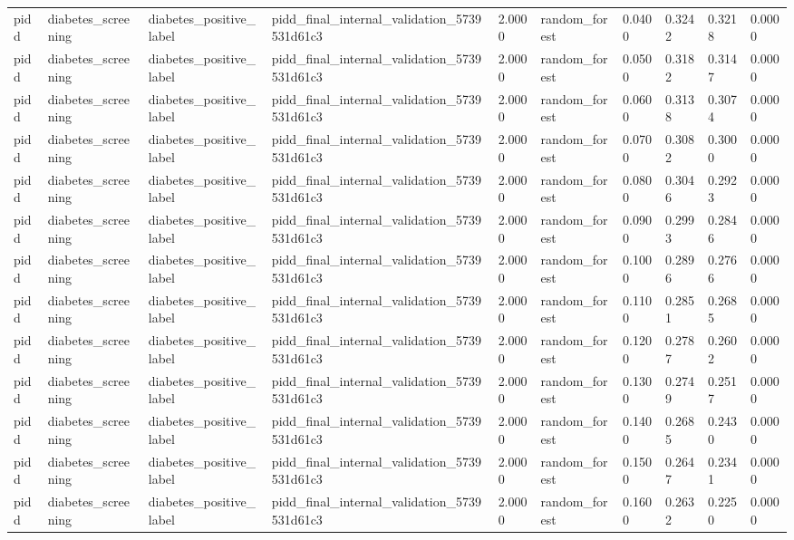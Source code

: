 \begin{tabular}{llllllllll}
pidd & diabetes\_screening & diabetes\_positive\_label & pidd\_final\_internal\_validation\_5739531d61c3 & 2.0000 & random\_forest & 0.0400 & 0.3242 & 0.3218 & 0.0000 \\
pidd & diabetes\_screening & diabetes\_positive\_label & pidd\_final\_internal\_validation\_5739531d61c3 & 2.0000 & random\_forest & 0.0500 & 0.3182 & 0.3147 & 0.0000 \\
pidd & diabetes\_screening & diabetes\_positive\_label & pidd\_final\_internal\_validation\_5739531d61c3 & 2.0000 & random\_forest & 0.0600 & 0.3138 & 0.3074 & 0.0000 \\
pidd & diabetes\_screening & diabetes\_positive\_label & pidd\_final\_internal\_validation\_5739531d61c3 & 2.0000 & random\_forest & 0.0700 & 0.3082 & 0.3000 & 0.0000 \\
pidd & diabetes\_screening & diabetes\_positive\_label & pidd\_final\_internal\_validation\_5739531d61c3 & 2.0000 & random\_forest & 0.0800 & 0.3046 & 0.2923 & 0.0000 \\
pidd & diabetes\_screening & diabetes\_positive\_label & pidd\_final\_internal\_validation\_5739531d61c3 & 2.0000 & random\_forest & 0.0900 & 0.2993 & 0.2846 & 0.0000 \\
pidd & diabetes\_screening & diabetes\_positive\_label & pidd\_final\_internal\_validation\_5739531d61c3 & 2.0000 & random\_forest & 0.1000 & 0.2896 & 0.2766 & 0.0000 \\
pidd & diabetes\_screening & diabetes\_positive\_label & pidd\_final\_internal\_validation\_5739531d61c3 & 2.0000 & random\_forest & 0.1100 & 0.2851 & 0.2685 & 0.0000 \\
pidd & diabetes\_screening & diabetes\_positive\_label & pidd\_final\_internal\_validation\_5739531d61c3 & 2.0000 & random\_forest & 0.1200 & 0.2787 & 0.2602 & 0.0000 \\
pidd & diabetes\_screening & diabetes\_positive\_label & pidd\_final\_internal\_validation\_5739531d61c3 & 2.0000 & random\_forest & 0.1300 & 0.2749 & 0.2517 & 0.0000 \\
pidd & diabetes\_screening & diabetes\_positive\_label & pidd\_final\_internal\_validation\_5739531d61c3 & 2.0000 & random\_forest & 0.1400 & 0.2685 & 0.2430 & 0.0000 \\
pidd & diabetes\_screening & diabetes\_positive\_label & pidd\_final\_internal\_validation\_5739531d61c3 & 2.0000 & random\_forest & 0.1500 & 0.2647 & 0.2341 & 0.0000 \\
pidd & diabetes\_screening & diabetes\_positive\_label & pidd\_final\_internal\_validation\_5739531d61c3 & 2.0000 & random\_forest & 0.1600 & 0.2632 & 0.2250 & 0.0000 \\

\end{tabular}
